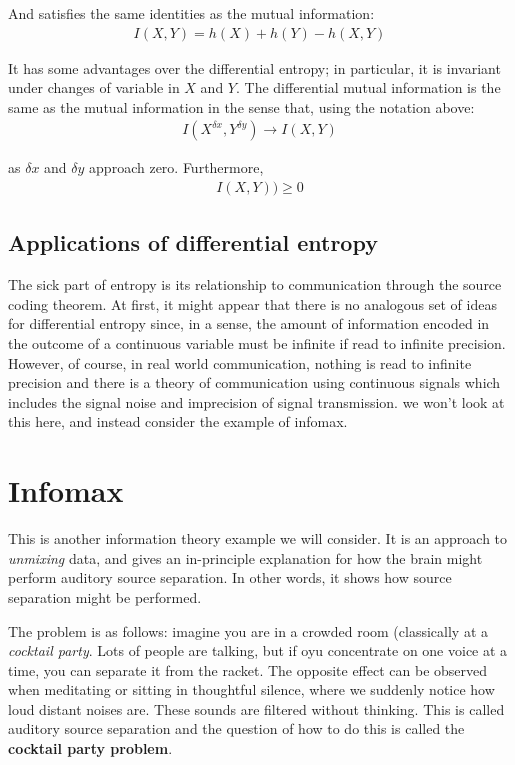 \documentclass[11pt,a4paper,titlepage,dvipsnames,cmyk]{scrartcl}
\begin{document}
And satisfies the same identities as the mutual information:
\begin{align*}
I(X,Y) = h(X) + h(Y) - h(X,Y)
\end{align*}

It has some advantages over the differential entropy; in particular, it is invariant under changes of variable in $X$ and $Y$. The differential mutual information is the same as the mutual information in the sense that, using the notation above:
\begin{align*}
I(X^{\delta x}, Y^{\delta y}) \rightarrow I(X,Y)
\end{align*}

as $\delta x$ and $\delta y$ approach zero. Furthermore,
\begin{align*}
I(X,Y)) \ge 0
\end{align*}

\subsection{Applications of differential entropy}
The sick part of entropy is its relationship to communication through the source coding theorem. At first, it might appear that there is no analogous set of ideas for differential entropy since, in a sense, the amount of information encoded in the outcome of a continuous variable must be infinite if read to infinite precision. However, of course, in real world communication, nothing is read to infinite precision and there is a theory of communication using continuous signals which includes the signal noise and imprecision of signal transmission. we won't look at this here, and instead consider the example of infomax.

\section{Infomax}
This is another information theory example we will consider. It is an approach to \textit{unmixing} data, and gives an in-principle explanation for how the brain might perform auditory source separation. In other words, it shows how source separation might be performed.

The problem is as follows: imagine you are in a crowded room (classically at a \textit{cocktail party}. Lots of people are talking, but if oyu concentrate on one voice at a time, you can separate it from the racket. The opposite effect can be observed when meditating or sitting in thoughtful silence, where we suddenly notice how loud distant noises are. These sounds are filtered without thinking. This is called auditory source separation and the question of how to do this is called the \textbf{cocktail party problem}.
\end{document}

